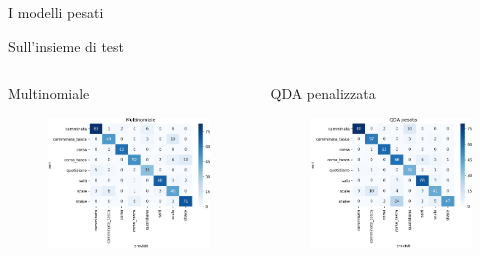 \documentclass{beamer}
\begin{document}
\begin{frame}{I modelli pesati}

\end{frame}

\begin{frame}{Sull'insieme di test}
\begin{columns}[T] %
\begin{column}{.5\textwidth}
\begin{center}
Multinomiale
\end{center}
\begin{figure}[H]
\includegraphics[width=\textwidth]{../figure/confusionMatrix-Mn-test.png}
\end{figure}
\end{column}%
\hfill%
\begin{column}{.5\textwidth}
\begin{center}
QDA penalizzata
\end{center}
\begin{figure}[H]
\includegraphics[width=\textwidth]{../figure/confusionMatrix-QDA-penalizzata-test.png}
\end{figure}
\end{column}%
\end{columns}
\end{frame}
\end{document}
